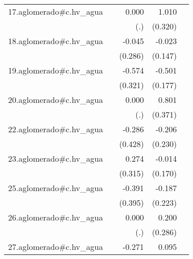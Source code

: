 {\begin{longtable}{l*{4}{D{.}{.}{-1}}}
\addlinespace
17.aglomerado#c.hv\_agua&                     &       0.000         &       1.010\sym{**} &                     \\
            &                     &         (.)         &     (0.320)         &                     \\
\addlinespace
18.aglomerado#c.hv\_agua&                     &      -0.045         &      -0.023         &                     \\
            &                     &     (0.286)         &     (0.147)         &                     \\
\addlinespace
19.aglomerado#c.hv\_agua&                     &      -0.574         &      -0.501\sym{**} &                     \\
            &                     &     (0.321)         &     (0.177)         &                     \\
\addlinespace
20.aglomerado#c.hv\_agua&                     &       0.000         &       0.801\sym{*}  &                     \\
            &                     &         (.)         &     (0.371)         &                     \\
\addlinespace
22.aglomerado#c.hv\_agua&                     &      -0.286         &      -0.206         &                     \\
            &                     &     (0.428)         &     (0.230)         &                     \\
\addlinespace
23.aglomerado#c.hv\_agua&                     &       0.274         &      -0.014         &                     \\
            &                     &     (0.315)         &     (0.170)         &                     \\
\addlinespace
25.aglomerado#c.hv\_agua&                     &      -0.391         &      -0.187         &                     \\
            &                     &     (0.395)         &     (0.223)         &                     \\
\addlinespace
26.aglomerado#c.hv\_agua&                     &       0.000         &       0.200         &                     \\
            &                     &         (.)         &     (0.286)         &                     \\
\addlinespace
27.aglomerado#c.hv\_agua&                     &      -0.271         &       0.095         &                     \\

\end{longtable}}
